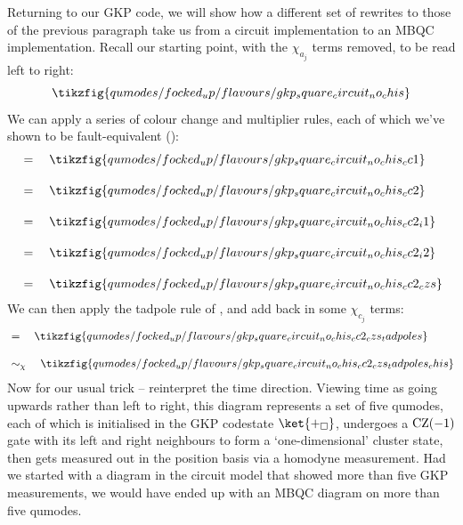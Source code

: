 Returning to our GKP code, we will show how a different set of rewrites to those of the previous paragraph take us from a circuit implementation to an MBQC implementation.
Recall our starting point, with the $\chi_{a_j}$ terms removed, to be read left to right:
\begin{equation}
    \tikzfig{qumodes/focked_up/flavours/gkp_square_circuit_no_chis}
\end{equation}
We can apply a series of colour change and multiplier rules, each of which we've shown to be fault-equivalent ():
\begin{equation}
    \begin{aligned}
        &=\quad \tikzfig{qumodes/focked_up/flavours/gkp_square_circuit_no_chis_cc1} \\[10pt]
        &=\quad \tikzfig{qumodes/focked_up/flavours/gkp_square_circuit_no_chis_cc2} \\[10pt]
        &=\quad \tikzfig{qumodes/focked_up/flavours/gkp_square_circuit_no_chis_cc2_i1} \\[10pt]
        &=\quad \tikzfig{qumodes/focked_up/flavours/gkp_square_circuit_no_chis_cc2_i2} \\[10pt]
        &=\quad \tikzfig{qumodes/focked_up/flavours/gkp_square_circuit_no_chis_cc2_czs}
    \end{aligned}
\end{equation}
We can then apply the tadpole rule of , and add back in some $\chi_{c_j}$ terms:
\begin{equation}
    \begin{aligned}
        &=\quad \tikzfig{qumodes/focked_up/flavours/gkp_square_circuit_no_chis_cc2_czs_tadpoles} \\[10pt]
        &\sim_{\chi}\quad \tikzfig{qumodes/focked_up/flavours/gkp_square_circuit_no_chis_cc2_czs_tadpoles_chis}
    \end{aligned}
\end{equation}
Now for our usual trick -- reinterpret the time direction.
Viewing time as going upwards rather than left to right, this diagram represents a set of five qumodes, each of which is initialised in the GKP codestate $\ket{+_\square}$, undergoes a $\operatorname{CZ}(-1)$ gate with its left and right neighbours to form a `one-dimensional' cluster state, then gets measured out in the position basis via a homodyne measurement.
Had we started with a diagram in the circuit model that showed more than five GKP measurements, we would have ended up with an MBQC diagram on more than five qumodes.
